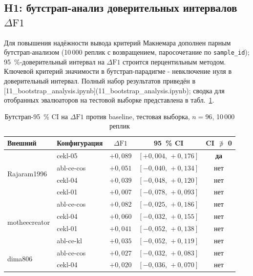 \documentclass[a4paper, 12pt, oneside, openany]{article}
\begin{document}
\subsection{H1: бутстрап-анализ доверительных интервалов $\Delta\mathrm{F1}$}

Для повышения надёжности вывода критерий Макнемара дополнен парным бутстрап-анализом (10\,000 реплик с возвращением, паросочетание по \texttt{sample\_id}); 95~\%-доверительный интервал на $\Delta\mathrm{F1}$ строится перцентильным методом. Ключевой критерий значимости в бутстрап-парадигме - невключение нуля в доверительный интервал. Полный набор результатов приведён в [11\_bootstrap\_analysis.ipynb](11\_bootstrap\_analysis.ipynb); сводка для отобранных эвалюаторов на тестовой выборке представлена в табл.~\ref{tab:bootstrap_test}.

\begin{table}[H]
\caption{Бутстрап-95~\% CI на $\Delta\mathrm{F1}$ против baseline, тестовая выборка, $n=96$, 10\,000 реплик}
\label{tab:bootstrap_test}
\centering
\small
\begin{tabular}{|p{2.6cm}|p{2.7cm}|c|c|c|}
\hline
\textbf{Внешний} & \textbf{Конфигурация} & $\Delta\mathrm{F1}$ & \textbf{95~\% CI} & \textbf{CI $\not\ni$ 0} \\
\hline
\multirow{4}{*}{Rajaram1996} & cekl-05 & $+0{,}089$ & $[+0{,}004,\,+0{,}176]$ & \textbf{да} \\
\cline{2-5}
& abl-ce-cos & $+0{,}051$ & $[-0{,}040,\,+0{,}134]$ & нет \\
\cline{2-5}
& cekl-04 & $+0{,}039$ & $[-0{,}048,\,+0{,}120]$ & нет \\
\cline{2-5}
& cekl-01 & $+0{,}007$ & $[-0{,}078,\,+0{,}093]$ & нет \\
\hline
\multirow{4}{*}{motheecreator} & abl-ce-cos & $+0{,}082$ & $[-0{,}025,\,+0{,}186]$ & нет \\
\cline{2-5}
& cekl-04 & $+0{,}060$ & $[-0{,}032,\,+0{,}155]$ & нет \\
\cline{2-5}
& cekl-01 & $+0{,}041$ & $[-0{,}052,\,+0{,}138]$ & нет \\
\cline{2-5}
& abl-ce-kl & $+0{,}035$ & $[-0{,}052,\,+0{,}119]$ & нет \\
\hline
\multirow{2}{*}{dima806} & abl-ce-cos & $+0{,}027$ & $[-0{,}032,\,+0{,}083]$ & нет \\
\cline{2-5}
& cekl-04 & $+0{,}020$ & $[-0{,}036,\,+0{,}070]$ & нет \\
\hline
\end{tabular}
\end{table}
\end{document}
